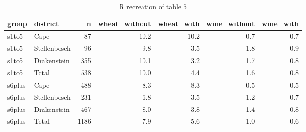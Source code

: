 \begin{table}

\caption{R recreation of table 6}
\centering
\begin{tabular}[t]{llrrrrr}
\toprule
group & district & n & wheat\_without & wheat\_with & wine\_without & wine\_with\\
\midrule
s1to5 & Cape & 87 & 10.2 & 10.2 & 0.7 & 0.7\\
s1to5 & Stellenbosch & 96 & 9.8 & 3.5 & 1.8 & 0.9\\
s1to5 & Drakenstein & 355 & 10.1 & 3.2 & 1.7 & 0.8\\
s1to5 & Total & 538 & 10.0 & 4.4 & 1.6 & 0.8\\
s6plus & Cape & 488 & 8.3 & 8.3 & 0.5 & 0.5\\
\addlinespace
s6plus & Stellenbosch & 231 & 6.8 & 3.5 & 1.2 & 0.7\\
s6plus & Drakenstein & 467 & 8.0 & 3.8 & 1.4 & 0.8\\
s6plus & Total & 1186 & 7.9 & 5.6 & 1.0 & 0.6\\
\bottomrule
\end{tabular}
\end{table}
